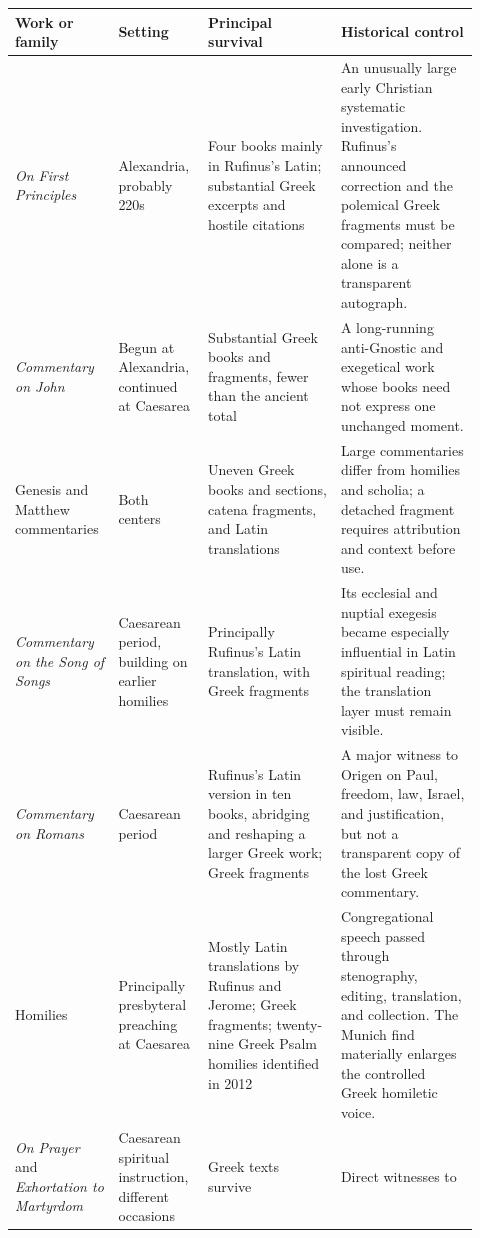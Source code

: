 \begingroup
\small
\setlength{\tabcolsep}{4pt}
\begin{longtable}{>{\raggedright\arraybackslash}p{0.20\linewidth}
                  >{\raggedright\arraybackslash}p{0.17\linewidth}
                  >{\raggedright\arraybackslash}p{0.27\linewidth}
                  >{\raggedright\arraybackslash}p{0.28\linewidth}}
\toprule
\textbf{Work or family} & \textbf{Setting} & \textbf{Principal survival} &
\textbf{Historical control}\\
\midrule
\endhead
\emph{On First Principles} & Alexandria, probably 220s & Four books mainly in
Rufinus's Latin; substantial Greek excerpts and hostile citations & An unusually
large early Christian systematic investigation. Rufinus's announced
correction and the polemical Greek fragments must be compared; neither alone is
a transparent autograph.\\
\emph{Commentary on John} & Begun at Alexandria, continued at Caesarea &
Substantial Greek books and fragments, fewer than the ancient total & A
long-running anti-Gnostic and exegetical work whose books need not express one
unchanged moment.\\
Genesis and Matthew commentaries & Both centers & Uneven Greek books and
sections, catena fragments, and Latin translations & Large commentaries differ
from homilies and scholia; a detached fragment requires attribution and context
before use.\\
\emph{Commentary on the Song of Songs} & Caesarean period, building on earlier
homilies & Principally Rufinus's Latin translation, with Greek fragments & Its
ecclesial and nuptial exegesis became especially influential in Latin spiritual
reading; the translation layer must remain visible.\\
\emph{Commentary on Romans} & Caesarean period & Rufinus's Latin version in ten
books, abridging and reshaping a larger Greek work; Greek fragments & A major
witness to Origen on Paul, freedom, law, Israel, and justification, but not a
transparent copy of the lost Greek commentary.\\
Homilies & Principally presbyteral preaching at Caesarea & Mostly Latin
translations by Rufinus and Jerome; Greek fragments; twenty-nine Greek Psalm
homilies identified in 2012 & Congregational speech passed through stenography,
editing, translation, and collection. The Munich find materially enlarges the
controlled Greek homiletic voice.\\
\emph{On Prayer} and \emph{Exhortation to Martyrdom} & Caesarean spiritual
instruction, different occasions & Greek texts survive & Direct witnesses to

\end{longtable}
